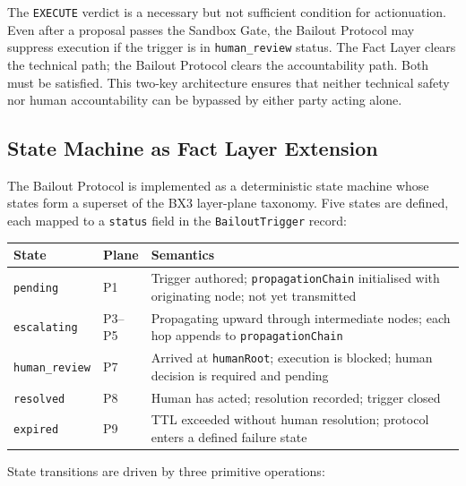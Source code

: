 The \texttt{EXECUTE} verdict is a necessary but not sufficient condition for
actionuation.  Even after a proposal passes the Sandbox Gate, the Bailout Protocol
may suppress execution if the trigger is in \texttt{human\_review} status.  The Fact
Layer clears the technical path; the Bailout Protocol clears the accountability path.
Both must be satisfied.  This two-key architecture ensures that neither technical
safety nor human accountability can be bypassed by either party acting alone.

\subsection{State Machine as Fact Layer Extension}

The Bailout Protocol is implemented as a deterministic state machine whose states
form a superset of the BX3 layer-plane taxonomy.  Five states are defined, each
mapped to a \texttt{status} field in the \texttt{BailoutTrigger} record:

\bigskip
\noindent
\begin{tabular}{llp{7.5cm}}
  \hline
  \textbf{State} & \textbf{Plane} & \textbf{Semantics} \\
  \hline
  \texttt{pending}         & P1 & Trigger authored; \texttt{propagationChain} initialised with
                              originating node; not yet transmitted \\
  \texttt{escalating}    & P3--P5 & Propagating upward through intermediate nodes;
                              each hop appends to \texttt{propagationChain} \\
  \texttt{human\_review} & P7 & Arrived at \texttt{humanRoot}; execution is blocked;
                              human decision is required and pending \\
  \texttt{resolved}      & P8 & Human has acted; resolution recorded; trigger closed \\
  \texttt{expired}       & P9 & TTL exceeded without human resolution; protocol
                              enters a defined failure state \\
  \hline
\end{tabular}
\bigskip

State transitions are driven by three primitive operations:

